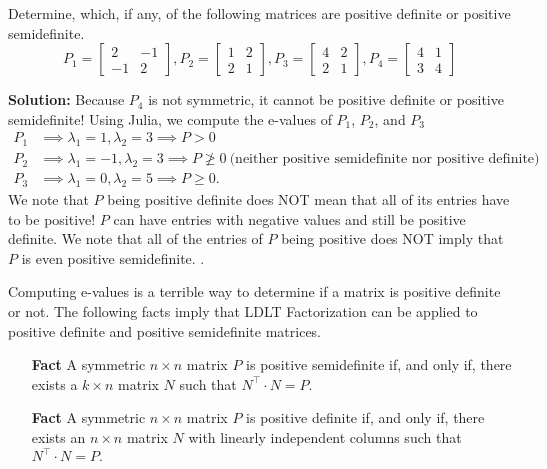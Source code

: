 \begin{example}
\label{ex:P0sDef01} Determine, which, if any, of the following matrices are positive definite or positive semidefinite.
$$ P_1 = \left[ \begin{array}{rr} 2 & -1 \\	-1 & 2 \end{array} \right],  P_2 = \left[ \begin{array}{rr} 1 & 2 \\	2 & 1 \end{array} \right], P_3 = \left[ \begin{array}{rr} 4 & 2 \\	2 & 1 \end{array} \right],  P_4 = \left[ \begin{array}{rr} 4 & 1 \\	3 & 4 \end{array} \right] $$
\end{example}

\textbf{Solution:} Because $P_4$ is not symmetric, it cannot be positive definite or positive semidefinite! Using Julia, we compute the e-values of $P_1$, $P_2$, and $P_3$
\begin{align*}
    P_1 &\implies \lambda_1 = 1, \lambda_2 = 3 \implies P > 0\\
    P_2 &\implies \lambda_1 = -1, \lambda_2 =3 \implies P \not \ge 0~\text{(neither positive semidefinite nor positive definite)} \\
    P_3 &\implies \lambda_1 = 0, \lambda_2 = 5\implies P \ge 0.
\end{align*}
We note that $P$ being positive definite does NOT mean that all of its entries have to be positive! $P$ can have entries with negative values and still be positive definite. We note that all of the entries of $P$ being positive does NOT imply that $P$ is even positive semidefinite.  
\Qed. 


\vspace*{.2cm}

Computing e-values is a terrible way to determine if a matrix is positive definite or not. The following facts imply that LDLT Factorization can be applied to positive definite and positive semidefinite matrices.

\begin{tcolorbox}[title=\textbf{\large \textcolor{red}{More on} Positive Definite and Semidefinite Matrices}]

\begin{enumerate}
    \item[{\bf Fact}]   A symmetric $n \times n$  matrix  $P$ is positive semidefinite if, and only if, there exists a $k \times n$ matrix $N$ such that $N^\top \cdot N = P.$\\
 
  
  \item[{\bf Fact}]   A symmetric $n \times n$ matrix $P$ is positive definite if, and only if, there exists an $n \times n$ matrix $N$ with linearly independent columns such that $N^\top \cdot N = P.$\end{enumerate}
\end{tcolorbox}

